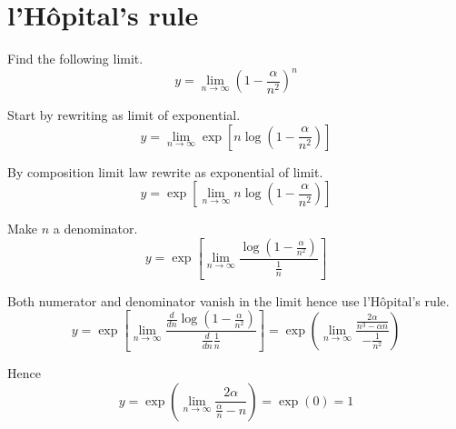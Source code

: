 

\section*{l'H\^opital's rule}

Find the following limit.
\begin{equation*}
y=\lim_{n\rightarrow\infty}\left(1-\frac{\alpha}{n^2}\right)^n
\end{equation*}

Start by rewriting as limit of exponential.
\begin{equation*}
y=\lim_{n\rightarrow\infty}\exp\left[n\log\left(1-\frac{\alpha}{n^2}\right)\right]
\end{equation*}

By composition limit law rewrite as exponential of limit.
\begin{equation*}
y=\exp\left[
\lim_{n\rightarrow\infty}
n\log\left(1-\frac{\alpha}{n^2}\right)
\right]
\end{equation*}

Make $n$ a denominator.
\begin{equation*}
y=\exp\left[\lim_{n\rightarrow\infty}\frac{\log\left(1-\frac{\alpha}{n^2}\right)}{\frac{1}{n}}\right]
\end{equation*}

Both numerator and denominator vanish in the limit hence use l'H\^opital's rule.
\begin{equation*}
y=\exp\left[
\lim_{n\rightarrow\infty}
\frac{\frac{d}{dn}\log\left(1-\frac{\alpha}{n^2}\right)}
{\frac{d}{dn}\frac{1}{n}}
\right]
=\exp\left(
\lim_{n\rightarrow\infty}
\frac
{\frac{2\alpha}{n^3-\alpha n}}
{-\frac{1}{n^2}}
\right)
\end{equation*}

Hence
\begin{equation*}
y=\exp\left(
\lim_{n\rightarrow\infty}
\frac{2\alpha}{\frac{\alpha}{n}-n}
\right)
=\exp(0)=1
\end{equation*}


